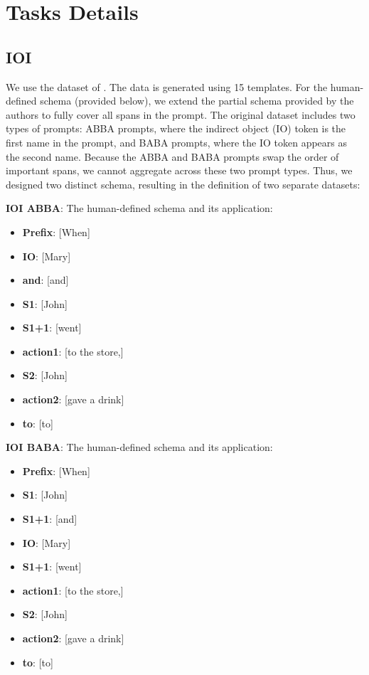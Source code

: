 \appendix

\section{Tasks Details} \label{ap:task details}

\subsection{IOI}
\label{ap:task details:ioi}

We use the dataset of \citet{wanginterpretability}. The data is generated using 15 templates. For the human-defined schema (provided below), we extend the partial schema provided by the authors to fully cover all spans in the prompt. The original dataset includes two types of prompts: ABBA prompts, where the indirect object (IO) token is the first name in the prompt, and BABA prompts, where the IO token appears as the second name. Because the ABBA and BABA prompts swap the order of important spans, we cannot aggregate across these two prompt types. Thus, we designed two distinct schema, resulting in the definition of two separate datasets: 

\noindent \textbf{IOI ABBA}:   
The human-defined schema and its application:

\begin{itemize}[itemsep=0pt, topsep=0pt]
    \item \textbf{Prefix}: [When]  
    \item \textbf{IO}: [Mary]  
    \item \textbf{and}: [and]  
    \item \textbf{S1}: [John]  
    \item \textbf{S1+1}: [went]  
    \item \textbf{action1}: [to the store,]  
    \item \textbf{S2}: [John]  
    \item \textbf{action2}: [gave a drink]  
    \item \textbf{to}: [to]  
\end{itemize}


\noindent \textbf{IOI BABA}: The human-defined schema and its application:  
\begin{itemize}[itemsep=0pt, topsep=0pt]
    \item \textbf{Prefix}: [When]  
    \item \textbf{S1}: [John]  
    \item \textbf{S1+1}: [and]  
    \item \textbf{IO}: [Mary]  
    \item \textbf{S1+1}: [went]  
    \item \textbf{action1}: [to the store,]  
    \item \textbf{S2}: [John]  
    \item \textbf{action2}: [gave a drink]  
    \item \textbf{to}: [to]  
\end{itemize}


